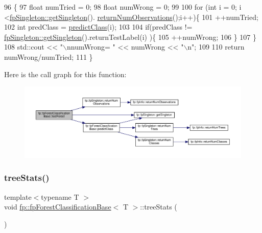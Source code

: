 \begin{DoxyCode}
96                               \{
97                 \textcolor{keywordtype}{float} numTried = 0;
98                 \textcolor{keywordtype}{float} numWrong = 0;
99 
100                 \textcolor{keywordflow}{for} (\textcolor{keywordtype}{int} i = 0; i <\hyperlink{classfp_1_1fpSingleton_a8bdae77b68521003e3fc630edec2e240}{fpSingleton::getSingleton}().
      \hyperlink{classfp_1_1fpSingleton_ae0a2963feb07b809b8740218f1048b67}{returnNumObservations}();i++)\{
101                     ++numTried;
102                     \textcolor{keywordtype}{int} predClass = \hyperlink{classfp_1_1fpForestClassificationBase_ad0c690fff971fab681467fbcd8762b5f}{predictClass}(i);
103 
104                     \textcolor{keywordflow}{if}(predClass != \hyperlink{classfp_1_1fpSingleton_a8bdae77b68521003e3fc630edec2e240}{fpSingleton::getSingleton}().returnTestLabel(i)
      )\{
105                         ++numWrong;
106                     \}
107                 \}
108                 std::cout << \textcolor{stringliteral}{"\(\backslash\)nnumWrong= "} << numWrong << \textcolor{stringliteral}{"\(\backslash\)n"};
109 
110                 \textcolor{keywordflow}{return} numWrong/numTried;
111             \}
\end{DoxyCode}
Here is the call graph for this function\+:
\nopagebreak
\begin{figure}[H]
\begin{center}
\leavevmode
\includegraphics[width=350pt]{classfp_1_1fpForestClassificationBase_a3f1ad5a5cfb3633713d0a81bd1c356e8_cgraph}
\end{center}
\end{figure}
\mbox{\label{classfp_1_1fpForestClassificationBase_a48567d379434daeccb1540c84674d286}} 
\subsubsection{\texorpdfstring{tree\+Stats()}{treeStats()}}
{\footnotesize\ttfamily template$<$typename T $>$ \\
void \hyperlink{classfp_1_1fpForestClassificationBase}{fp\+::fp\+Forest\+Classification\+Base}$<$ T $>$\+::tree\+Stats (\begin{DoxyParamCaption}{ }\end{DoxyParamCaption})\hspace{0.3cm}{\ttfamily [inline]}}



